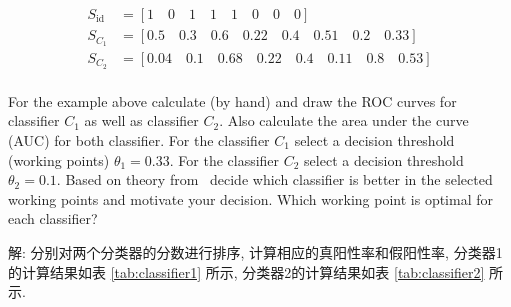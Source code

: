 \documentclass{article}
\begin{document}
\begin{equation}
  \begin{aligned}
    S_{\text{id}} &= [1\quad 0 \quad 1 \quad 1 \quad 1 \quad 0 \quad 0 \quad 0]\\
    S_{C_1} &= [0.5\quad 0.3 \quad 0.6 \quad 0.22 \quad 0.4 \quad 0.51 \quad 0.2 \quad 0.33] \\
    S_{C_2} &= [0.04\quad 0.1 \quad 0.68 \quad 0.22 \quad 0.4 \quad 0.11 \quad 0.8 \quad 0.53]\\
  \end{aligned}
\end{equation}

For the example above calculate (by hand) and draw the ROC curves for classifier $C_1$ as well as classifier $C_2$. Also calculate the area under the curve (AUC) for both classifier. For the classifier $C_1$ select a decision threshold (working points) $\theta_{1}=0.33$. For the classifier $C_2$ select a decision threshold  $\theta_{2}=0.1$.  Based on theory from~\cite{b1} decide which classifier is better in the selected working points and motivate your decision. Which working point is optimal for each classifier? 

解: 分别对两个分类器的分数进行排序, 计算相应的真阳性率和假阳性率, 分类器1的计算结果如表 \ref{tab:classifier1} 所示, 分类器2的计算结果如表 \ref{tab:classifier2} 所示.
\end{document}
